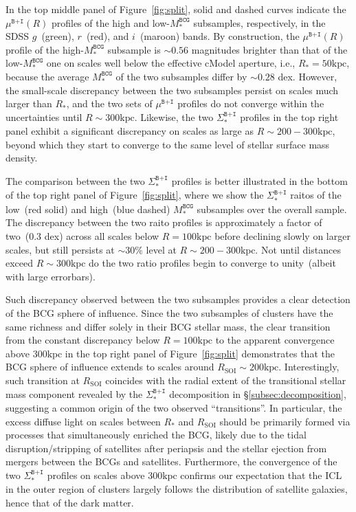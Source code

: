 \documentclass[fleqn,usenatbib]{mnras}
\newcommand{\rsoi}{R_{\mathrm{SOI}}}
\newcommand{\sigbi}{\Sigma_*^{\texttt{B+I}}}
\newcommand{\mubi}{\mu^{\texttt{B+I}}}
\newcommand{\msbcg}{M_*^{\texttt{BCG}}}
\newcommand{\kpc}{\mathrm{kpc}}
\newcommand\xkchen[1]{{\color{cyan} {#1}}}
\begin{document}
In the top middle panel of Figure~\ref{fig:split}, solid and dashed curves
indicate the $\mubi(R)$ profiles of the high and low-$\msbcg$ subsamples,
respectively, in the SDSS $g$~(green), $r$~(red), and $i$~(maroon) bands.
By construction, the $\mubi(R)$ profile of the high-$\msbcg$ subsample is
\xkchen{$\sim0.56$} magnitudes brighter than that of the low-$\msbcg$ one on scales well
below the effective cModel aperture, i.e., $R_*{=}50\kpc$, because the
average $\msbcg$ of the two subsamples differ by \xkchen{$\sim0.28$} dex. However, the
small-scale discrepancy between the two subsamples persist on scales much
larger than $R_*$, and the two sets of $\mubi$ profiles do not converge
within the uncertainties until $R{\sim}300\kpc$. Likewise, the two $\sigbi$
profiles in the top right panel exhibit a significant discrepancy on scales
as large as $R{\sim}200{-}300\kpc$, beyond which they start to converge to
the same level of stellar surface mass density.


The comparison between the two $\sigbi$ profiles is better illustrated in
the bottom of the top right panel of Figure~\ref{fig:split}, where we show
the $\sigbi$ raitos of the low~(red solid) and high~(blue dashed) $\msbcg$
subsamples over the overall sample.  The discrepancy between the two raito
profiles is approximately a factor of two~(0.3 dex) across all scales below
$R{=}100\kpc$ before declining slowly on larger scales, but still persists
at ${\sim}30\%$ level at $R{\sim}200{-}300\kpc$.  Not until distances
exceed $R{\sim}300\kpc$ do the two ratio profiles begin to converge to
unity~(albeit with large errorbars).


Such discrepancy observed between the two subsamples provides a clear
detection of the BCG sphere of influence. Since the two subsamples of
clusters have the same richness and differ solely in their BCG stellar
mass, the clear transition from the constant discrepancy below
$R{=}100\kpc$ to the apparent convergence above $300\kpc$ in the top right
panel of Figure~\ref{fig:split} demonstrates that the BCG sphere of
influence extends to scales around $\rsoi{\sim}200\kpc$.
Interestingly, such transition at $\rsoi$ coincides with the radial extent
of the transitional stellar mass component revealed by the $\sigbi$
decomposition in \S\ref{subsec:decomposition}, suggesting a common origin
of the two observed ``transitions''. In particular, the excess diffuse
light on scales between $R_*$ and $\rsoi$ should be primarily formed via
processes that simultaneously enriched the BCG, likely due to the tidal
disruption/stripping of satellites after periapsis and the stellar ejection
from mergers between the BCGs and satellites. Furthermore, the convergence
of the two $\sigbi$ profiles on scales above $300\kpc$ confirms our
expectation that the ICL in the outer region of clusters largely follows
the distribution of satellite galaxies, hence that of the dark matter.
\end{document}
